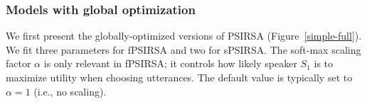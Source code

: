 \documentclass[10pt,a4paper]{article}
\begin{document}
\subsubsection{Models with global optimization}

We first present the globally-optimized versions of PSIRSA (Figure~\ref{simple-full}).
We fit three parameters for fPSIRSA and two for sPSIRSA.
The soft-max scaling factor $\alpha$ is only relevant in fPSIRSA;
it controls how likely speaker $S_1$ is to maximize utility when choosing utterances. 
The default value is typically set to $\alpha=1$ (i.e., no scaling). 
\end{document}
